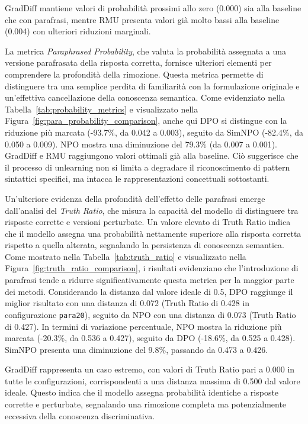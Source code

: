 GradDiff mantiene valori di probabilità prossimi allo zero (0.000) sia alla baseline che con parafrasi, mentre RMU presenta valori già molto bassi alla baseline (0.004) con ulteriori riduzioni marginali.

La metrica \textit{Paraphrased Probability}, che valuta la probabilità assegnata a una versione parafrasata della risposta corretta, fornisce ulteriori elementi per comprendere la profondità della rimozione. Questa metrica permette di distinguere tra una semplice perdita di familiarità con la formulazione originale e un'effettiva cancellazione della conoscenza semantica. Come evidenziato nella Tabella~\ref{tab:probability_metrics} e visualizzato nella Figura~\ref{fig:para_probability_comparison}, anche qui DPO si distingue con la riduzione più marcata (-93.7\%, da 0.042 a 0.003), seguito da SimNPO (-82.4\%, da 0.050 a 0.009). NPO mostra una diminuzione del 79.3\% (da 0.007 a 0.001). GradDiff e RMU raggiungono valori ottimali già alla baseline. Ciò suggerisce che il processo di unlearning non si limita a degradare il riconoscimento di pattern sintattici specifici, ma intacca le rappresentazioni concettuali sottostanti.

Un'ulteriore evidenza della profondità dell'effetto delle parafrasi emerge dall'analisi del \textit{Truth Ratio}, che misura la capacità del modello di distinguere tra risposte corrette e versioni perturbate. Un valore elevato di Truth Ratio indica che il modello assegna una probabilità nettamente superiore alla risposta corretta rispetto a quella alterata, segnalando la persistenza di conoscenza semantica. Come mostrato nella Tabella~\ref{tab:truth_ratio} e visualizzato nella Figura~\ref{fig:truth_ratio_comparison}, i risultati evidenziano che l'introduzione di parafrasi tende a ridurre significativamente questa metrica per la maggior parte dei metodi. Considerando la distanza dal valore ideale di 0.5, DPO raggiunge il miglior risultato con una distanza di 0.072 (Truth Ratio di 0.428 in configurazione \texttt{para20}), seguito da NPO con una distanza di 0.073 (Truth Ratio di 0.427). In termini di variazione percentuale, NPO mostra la riduzione più marcata (-20.3\%, da 0.536 a 0.427), seguito da DPO (-18.6\%, da 0.525 a 0.428). SimNPO presenta una diminuzione del 9.8\%, passando da 0.473 a 0.426.

GradDiff rappresenta un caso estremo, con valori di Truth Ratio pari a 0.000 in tutte le configurazioni, corrispondenti a una distanza massima di 0.500 dal valore ideale. Questo indica che il modello assegna probabilità identiche a risposte corrette e perturbate, segnalando una rimozione completa ma potenzialmente eccessiva della conoscenza discriminativa.

